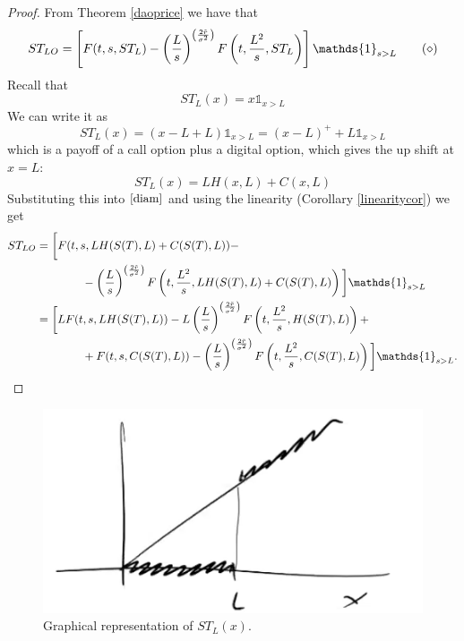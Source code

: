 \begin{proof}
    From Theorem \ref{daoprice} we have that
    \begin{equation}\label{diam}
      ST_{LO} = \left[F(t,s,ST_L) - \left(\frac{L}{s}\right)^{\left(\frac{2\Tilde{r}}{\sigma^2}\right)} F\left(t,\frac{L^2}{s},ST_L\right)\right]\mathds{1}_{s>L} \tag{$\diamond$}
    \end{equation}
    Recall that
    \begin{equation*}
      ST_L(x) = x\mathds{1}_{x>L}
    \end{equation*}
    We can write it as
    \begin{equation*}
      ST_L(x) = (x-L+L)\mathds{1}_{x>L} = (x-L)^+ + L\mathds{1}_{x>L}
    \end{equation*}
    which is a payoff of a call option plus a digital option, which gives the up shift at $x=L$:
    \begin{equation*}
      ST_L(x) = LH(x,L) + C(x,L)
    \end{equation*}
    Substituting this into $\eqref{diam}$ and using the linearity (Corollary \ref{linearitycor}) we get
    \begin{align*}
      ST_{LO} &= \bigg[F(t,s,LH(S(T),L)+C(S(T),L)) - \\
      &\qquad\qquad
      - \left(\frac{L}{s}\right)^{\left(\frac{2\Tilde{r}}{\sigma^2}\right)} F\left(t,\frac{L^2}{s}, LH(S(T),L) + C(S(T),L)\right)\bigg]\mathds{1}_{s>L} \\
      &=
      \bigg[LF(t,s,LH(S(T),L)) - L\left(\frac{L}{s}\right)^{\left(\frac{2\Tilde{r}}{\sigma^2}\right)} F\left(t,\frac{L^2}{s},H(S(T),L)\right) + \\
      &\qquad\qquad
      + F(t,s,C(S(T),L)) - \left(\frac{L}{s}\right)^{\left(\frac{2\Tilde{r}}{\sigma^2}\right)} F\left(t,\frac{L^2}{s},C(S(T),L)\right)\bigg]\mathds{1}_{s>L}.
    \end{align*}
\end{proof}
\begin{figure}[h]
  \centering
  \includegraphics[scale=0.3]{fig/tmp/fig39}
  \caption{Graphical representation of $ST_L(x)$.}
\end{figure}
